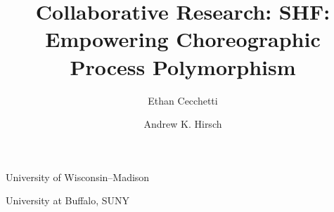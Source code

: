 

\title{Collaborative Research: SHF: \\ Empowering Choreographic Process Polymorphism}
\author{Ethan Cecchetti}{University of Wisconsin--Madison}
\author{Andrew K. Hirsch}{University at Buffalo, SUNY}

\ifdraft
  \usepackage{fancyhdr}
  \pagestyle{fancy}
  \fancyhf{}
  \def\headrulewidth{0pt}
  \fancyfoot[C]{\thepage}
\else
  \pagestyle{plain}
\fi



\newtheorem{goal}{Goal}


\newpage





